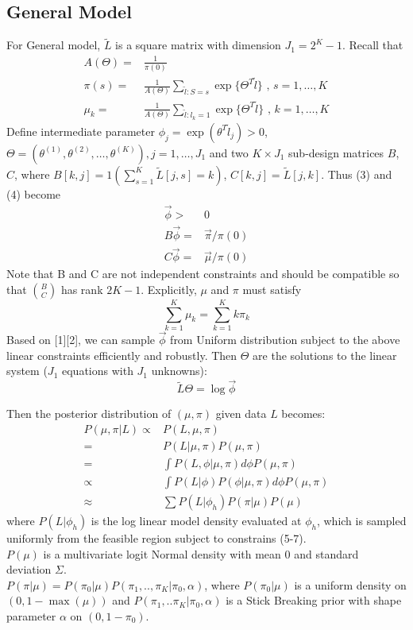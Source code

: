 \documentclass[11 pt, a4paper]{article}  %
\begin{document}
\subsection{General Model}
For General model, $\tilde{L}$ is a square matrix with dimension $J_1 = 2^K-1$. Recall that 
\begin{align}
A(\Theta) = & \frac{1}{\pi(0)} \nonumber \\
\pi(s) = & \frac{1}{A(\Theta)} \sum_{\tilde{l}:S=s}\exp \{ \Theta^T \tilde{l}\}  \text{ , } s = 1,\ldots, K \\
\mu_k = & \frac{1}{A(\Theta)} \sum_{\tilde{l}:l_k=1}\exp \{ \Theta^T \tilde{l}\}  \text{ , } k = 1, \ldots, K
\end{align}
Define intermediate parameter $\phi_j = \exp(\theta^T\tilde{l}_j) >0$, $\Theta = (\theta^{(1)},\theta^{(2)}, \ldots, \theta^{(K)}), j= 1, \ldots, J_1$ and two $K \times J_1$ sub-design matrices $B$, $C$, where $B[k,j] = 1(\sum_{s=1}^K\tilde{L}[j,s]=k)$, $C[k,j] = \tilde{L}[j,k]$. Thus (3) and (4) become
\begin{align}
\vec{\phi} > & 0\\
B \vec{\phi} = & \vec{\pi}/\pi(0)\\ 
C \vec{\phi} = & \vec{\mu}/\pi(0)
\end{align}
Note that B and C are not independent constraints and should be compatible so that $\binom{B}{C}$ has rank $2K-1$.
Explicitly, $\mu$ and $\pi$ must satisfy  
\[ \sum_{k=1}^K \mu_k = \sum_{k=1}^K k\pi_k\]
Based on [1][2], we can sample $\vec{\phi}$ from Uniform distribution subject to the above linear constraints efficiently and robustly. Then $\Theta$ are the solutions to the linear system ($J_1$ equations with $J_1$ unknowns):
\[\tilde{L}\Theta = \log \vec{\phi}\]

Then the posterior distribution of $(\mu, \pi)$ given data $L$ becomes:
\begin{align*}
P(\mu, \pi |L) \propto & P(L, \mu, \pi) \\
= & P(L | \mu, \pi) P(\mu, \pi) \\
= & \int P(L, \phi | \mu, \pi) d \phi P(\mu, \pi) \\
\propto & \int P(L | \phi) P(\phi | \mu,\pi) d \phi P(\mu, \pi) \\
\approx & \sum P(L | \phi_h) P(\pi | \mu) P(\mu)
\end{align*}
where $P(L | \phi_h)$ is the log linear model density evaluated at $\phi_h$, which is sampled uniformly from the feasible region subject to constrains (5-7).\\
$P(\mu)$ is a multivariate logit Normal density with mean $0$ and standard deviation $\Sigma$.\\
$P(\pi | \mu) = P(\pi_0 | \mu)P(\pi_1,.., \pi_K |\pi_0, \alpha)$, where $P(\pi_0 | \mu)$ is a uniform density on $(0, 1-\max(\mu))$ and $P(\pi_1,..\pi_K |\pi_0, \alpha)$ is a Stick Breaking prior with shape parameter $\alpha$ on $(0, 1-\pi_0)$.
\end{document}

